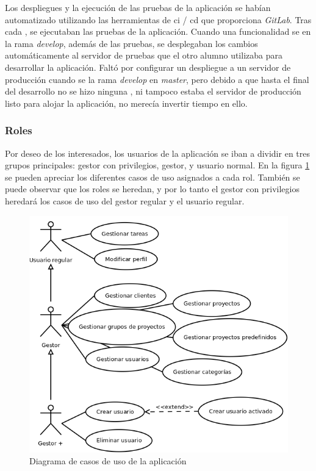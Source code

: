Los despliegues y la ejecución de las pruebas de la aplicación se habían automatizado
utilizando las herramientas de \gls{ci} / \gls{cd} que proporciona \textit{GitLab}. Tras cada
, se ejecutaban las pruebas de la aplicación. Cuando una funcionalidad
se  en la rama \textit{develop}, además de las pruebas, se
desplegaban los cambios automáticamente al servidor de pruebas que el otro alumno
utilizaba para desarrollar la aplicación. Faltó por configurar un despliegue a un
servidor de producción cuando se  la rama \textit{develop}
en \textit{master}, pero debido a que hasta el final del desarrollo no se hizo ninguna
, ni tampoco estaba el servidor de producción listo para
alojar la aplicación, no merecía invertir tiempo en ello.

\subsubsection{Roles}
\label{sec:roles}
Por deseo de los interesados, los usuarios de la aplicación se iban a dividir
en tres grupos principales: gestor con privilegios, gestor, y usuario normal.
En la figura \ref{fig:useCases} se pueden apreciar los diferentes casos de uso
asignados a cada rol. También se puede observar que los roles se heredan, y por
lo tanto el gestor con privilegios heredará los casos de uso del gestor regular
y el usuario regular.

\begin{figure}[p]
    \center
    \includegraphics[scale=0.6]{img/useCase}
    \caption{Diagrama de casos de uso de la aplicación}
    \label{fig:useCases}
\end{figure}

